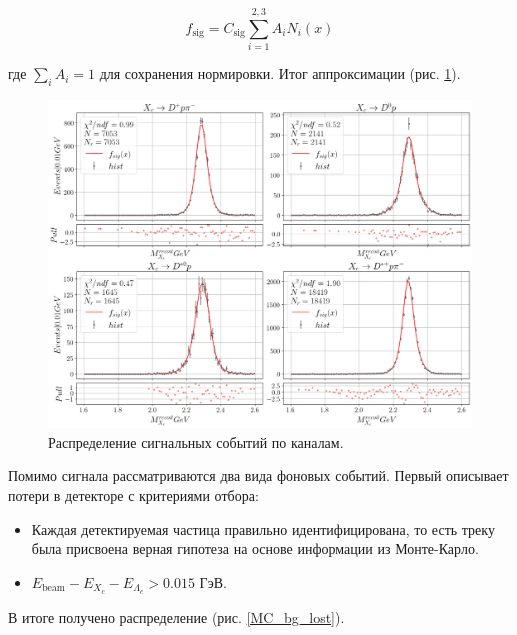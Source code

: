\begin{equation}
    f_{\text{sig}} = C_{\text{sig}}\sum_{i=1}^{2,3} A_i N_i(x)
\end{equation}

где $\sum_i A_i = 1$ для сохранения нормировки. Итог аппроксимации (рис. \ref{MC_sig_fit}).

\begin{figure}[H]
    \centering
    \includegraphics[width=1\linewidth]{img/MC_sig_fit.png}
    \caption{Распределение сигнальных событий по каналам.}
    \label{MC_sig_fit}
\end{figure}

Помимо сигнала рассматриваются два вида фоновых событий. Первый описывает потери в детекторе с критериями отбора:

\begin{itemize}
    \item Каждая детектируемая частица правильно идентифицирована, то есть треку была присвоена верная гипотеза на основе информации из Монте-Карло.
    \item $E_{\text{beam}} - E_{X_c} - E_{\Lambda_c} > 0.015$ ГэВ.
\end{itemize}

В итоге получено распределение (рис. \ref{MC_bg_lost}).

